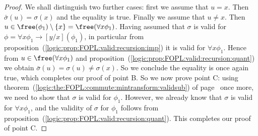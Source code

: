\begin{proof}
We shall distinguish two further cases: first we assume that $u=x$.
Then $\bar{\sigma}(u)=\sigma(x)$ and the equality is true. Finally
we assume that $u\neq x$. Then
$u\in\free(\phi_{1})\setminus\{x\}=\free(\forall x\phi_{1})$. Having
assumed that $\sigma$ is valid for $\phi=\forall
x\phi_{1}\to[y/x](\phi_{1})$, in particular from
proposition~(\ref{logic:prop:FOPL:valid:recursion:imp}) it is valid
for $\forall x\phi_{1}$. Hence from $u\in\free(\forall x\phi_{1})$
and proposition~(\ref{logic:prop:FOPL:valid:recursion:quant}) we
obtain $\bar{\sigma}(u)=\sigma(u)\neq\sigma(x)$. So we conclude the
equality is once again true, which completes our proof of point B.
So we now prove point C: using
theorem~(\ref{logic:the:FOPL:commute:mintransform:validsub}) of
page~\pageref{logic:the:FOPL:commute:mintransform:validsub} once
more, we need to show that $\sigma$ is valid for $\phi_{1}$.
However, we already know that $\sigma$ is valid for $\forall
x\phi_{1}$, and the validity of $\sigma$ for $\phi_{1}$ follows from
proposition~(\ref{logic:prop:FOPL:valid:recursion:quant}). This
completes our proof of point C.
\end{proof}
